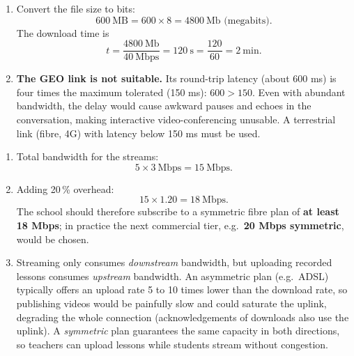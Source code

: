\documentclass[11pt]{article}
\begin{document}
\begin{corrige}
\begin{enumerate}
\item Convert the file size to bits:
\[ 600\ \text{MB} = 600 \times 8 = 4800\ \text{Mb (megabits)}. \]
The download time is
\[ t = \dfrac{4800\ \text{Mb}}{40\ \text{Mbps}} = 120\ \text{s} = \dfrac{120}{60} = 2\ \text{min}. \]
\item \textbf{The GEO link is not suitable.} Its round-trip latency (about 600 ms) is four times the maximum tolerated (150 ms): $600 > 150$. Even with abundant bandwidth, the delay would cause awkward pauses and echoes in the conversation, making interactive video-conferencing unusable. A terrestrial link (fibre, 4G) with latency below 150 ms must be used.
\end{enumerate}
\end{corrige}

\begin{corrige}
\begin{enumerate}
\item Total bandwidth for the streams:
\[ 5 \times 3\ \text{Mbps} = 15\ \text{Mbps}. \]
\item Adding 20\,\% overhead:
\[ 15 \times 1.20 = 18\ \text{Mbps}. \]
The school should therefore subscribe to a symmetric fibre plan of \textbf{at least 18 Mbps}; in practice the next commercial tier, e.g.\ \textbf{20 Mbps symmetric}, would be chosen.
\item Streaming only consumes \emph{downstream} bandwidth, but uploading recorded lessons consumes \emph{upstream} bandwidth. An asymmetric plan (e.g.\ ADSL) typically offers an upload rate 5 to 10 times lower than the download rate, so publishing videos would be painfully slow and could saturate the uplink, degrading the whole connection (acknowledgements of downloads also use the uplink). A \emph{symmetric} plan guarantees the same capacity in both directions, so teachers can upload lessons while students stream without congestion.
\end{enumerate}
\end{corrige}
\end{document}
